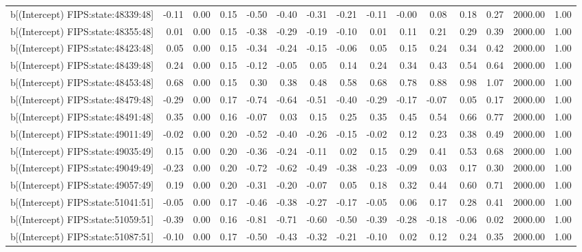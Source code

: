 \begin{table}[ht]
\begin{tabular}{rrrrrrrrrrrrrrr}
  b[(Intercept) FIPS:state:48339:48] & -0.11 & 0.00 & 0.15 & -0.50 & -0.40 & -0.31 & -0.21 & -0.11 & -0.00 & 0.08 & 0.18 & 0.27 & 2000.00 & 1.00 \\ 
  b[(Intercept) FIPS:state:48355:48] & 0.01 & 0.00 & 0.15 & -0.38 & -0.29 & -0.19 & -0.10 & 0.01 & 0.11 & 0.21 & 0.29 & 0.39 & 2000.00 & 1.00 \\ 
  b[(Intercept) FIPS:state:48423:48] & 0.05 & 0.00 & 0.15 & -0.34 & -0.24 & -0.15 & -0.06 & 0.05 & 0.15 & 0.24 & 0.34 & 0.42 & 2000.00 & 1.00 \\ 
  b[(Intercept) FIPS:state:48439:48] & 0.24 & 0.00 & 0.15 & -0.12 & -0.05 & 0.05 & 0.14 & 0.24 & 0.34 & 0.43 & 0.54 & 0.64 & 2000.00 & 1.00 \\ 
  b[(Intercept) FIPS:state:48453:48] & 0.68 & 0.00 & 0.15 & 0.30 & 0.38 & 0.48 & 0.58 & 0.68 & 0.78 & 0.88 & 0.98 & 1.07 & 2000.00 & 1.00 \\ 
  b[(Intercept) FIPS:state:48479:48] & -0.29 & 0.00 & 0.17 & -0.74 & -0.64 & -0.51 & -0.40 & -0.29 & -0.17 & -0.07 & 0.05 & 0.17 & 2000.00 & 1.00 \\ 
  b[(Intercept) FIPS:state:48491:48] & 0.35 & 0.00 & 0.16 & -0.07 & 0.03 & 0.15 & 0.25 & 0.35 & 0.45 & 0.54 & 0.66 & 0.77 & 2000.00 & 1.00 \\ 
  b[(Intercept) FIPS:state:49011:49] & -0.02 & 0.00 & 0.20 & -0.52 & -0.40 & -0.26 & -0.15 & -0.02 & 0.12 & 0.23 & 0.38 & 0.49 & 2000.00 & 1.00 \\ 
  b[(Intercept) FIPS:state:49035:49] & 0.15 & 0.00 & 0.20 & -0.36 & -0.24 & -0.11 & 0.02 & 0.15 & 0.29 & 0.41 & 0.53 & 0.68 & 2000.00 & 1.00 \\ 
  b[(Intercept) FIPS:state:49049:49] & -0.23 & 0.00 & 0.20 & -0.72 & -0.62 & -0.49 & -0.38 & -0.23 & -0.09 & 0.03 & 0.17 & 0.30 & 2000.00 & 1.00 \\ 
  b[(Intercept) FIPS:state:49057:49] & 0.19 & 0.00 & 0.20 & -0.31 & -0.20 & -0.07 & 0.05 & 0.18 & 0.32 & 0.44 & 0.60 & 0.71 & 2000.00 & 1.00 \\ 
  b[(Intercept) FIPS:state:51041:51] & -0.05 & 0.00 & 0.17 & -0.46 & -0.38 & -0.27 & -0.17 & -0.05 & 0.06 & 0.17 & 0.28 & 0.41 & 2000.00 & 1.00 \\ 
  b[(Intercept) FIPS:state:51059:51] & -0.39 & 0.00 & 0.16 & -0.81 & -0.71 & -0.60 & -0.50 & -0.39 & -0.28 & -0.18 & -0.06 & 0.02 & 2000.00 & 1.00 \\ 
  b[(Intercept) FIPS:state:51087:51] & -0.10 & 0.00 & 0.17 & -0.50 & -0.43 & -0.32 & -0.21 & -0.10 & 0.02 & 0.12 & 0.24 & 0.35 & 2000.00 & 1.00 \\ 

\end{tabular}
\end{table}
